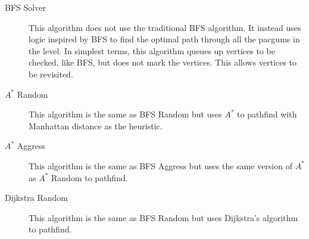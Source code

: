 \documentclass[12pt]{article}
\begin{document}
\begin{description}
      \item[BFS Solver] This algorithm does not use the traditional BFS algorithm. It instead uses logic inspired by BFS to find the optimal path through all the pacgums in the level. In simplest terms, this algorithm queues up vertices to be checked, like BFS, but does not mark the vertices. This allows vertices to be revisited.
      \item[$A^*$ Random] This algorithm is the same as BFS Random but uses $A^*$ to pathfind with Manhattan distance as the heuristic.
      \item[$A^*$ Aggress] This algorithm is the same as BFS Aggress but uses the same version of $A^*$ as $A^*$ Random to pathfind.
      \item[Dijkstra Random] This algorithm is the same as BFS Random but uses Dijkstra's algorithm to pathfind.
    \end{description}
\end{document}
